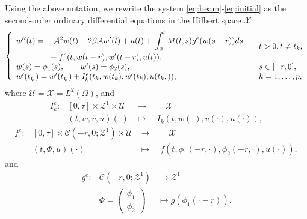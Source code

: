 \documentclass[11 pt]{amsart}
\begin{document}
Using the above notation, we rewrite the system \eqref{eq:beam}-\eqref{eq:initial}  as the second-order ordinary differential equations in the Hilbert
space ${\mathcal{X}}$
\begin{equation} \label{eq:ODE}
\left\{\begin{array}{lll}
    \begin{split}
    w''(t) = &-{\mathcal{A}}^{2}w(t) - 2\beta {\mathcal{A}} w'(t) + u(t) + {\displaystyle} \int_{0}^{t}M(t,s)g^{e}(w(s-r))ds \\
 &\ \ +  f^{e}(t,w(t-r),w'(t-r),u(t)),
 \end{split}
 & & t>0, t \neq t_k,\\
     w(s)  =  \phi_1(s), \qquad  w'(s)=\phi_2(s),
& &s \in [-r,0],\\
 w' (t_{k}^{+}) = w' (t_{k}^{-})+I^{e}_{k}(t_k,w(t_{k}),w' (t_{k}),u(t_{k},)),& & k=1, \dots, p,
    \end{array}\right.
\end{equation}
where ${\mathcal{U}}={\mathcal{X}}=L^{2}(\Omega)$, and
\begin{eqnarray*}
I_{k}^{e}:&[0, \tau]\times {\mathcal{Z}}^{1} \times {\mathcal{U}} &\longrightarrow \qquad {\mathcal{X}} \\
&(t,w,v,u)(\cdot)&\longmapsto \quad I_{k}(t,w(\cdot),v(\cdot),u(\cdot)),
\end{eqnarray*}
\begin{eqnarray*}
f^{e}:&[0, \tau]\times {\mathcal{C}} (-r,0;  {\mathcal{Z}}^{1} ) \times {\mathcal{U}} & \longrightarrow \qquad {\mathcal{X}}\\
&(t,\Phi,u)(\cdot)&\longmapsto \quad f(t,\phi_1(-r, \cdot),\phi_2(-r, \cdot),u(\cdot)),
\end{eqnarray*}
and
\begin{eqnarray*}
g^{e}:&{\mathcal{C}}(-r,0;  {\mathcal{Z}}^{1} )  &\longrightarrow  {\mathcal{Z}}^{1} \\
&\Phi=\left(\begin{array}{c}
             \phi_1\\
             \phi_2
        \end{array}\right)&\longmapsto  g(\phi_1(\cdot-r)).
\end{eqnarray*}
\end{document}

